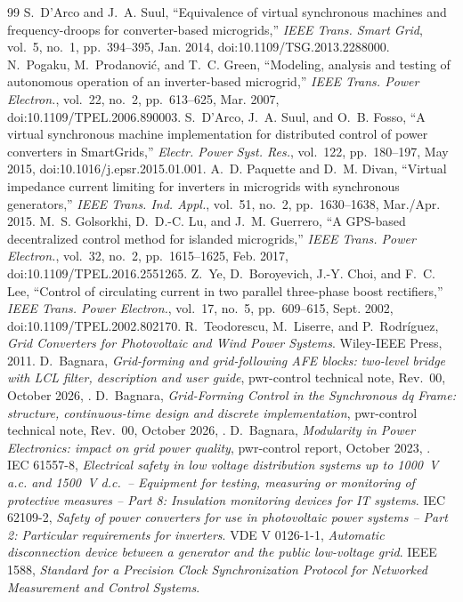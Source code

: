 \documentclass[11pt,a4paper]{scrartcl}
\begin{document}
\begin{onehalfspace}
\begin{thebibliography}{99}
	 S.~D'Arco and J.~A. Suul, ``Equivalence of virtual synchronous machines and frequency-droops for converter-based microgrids,'' \emph{IEEE Trans. Smart Grid}, vol.~5, no.~1, pp.~394--395, Jan. 2014, doi:10.1109/TSG.2013.2288000.
	 N.~Pogaku, M.~Prodanovi\'c, and T.~C. Green, ``Modeling, analysis and testing of autonomous operation of an inverter-based microgrid,'' \emph{IEEE Trans. Power Electron.}, vol.~22, no.~2, pp.~613--625, Mar. 2007, doi:10.1109/TPEL.2006.890003.
	 S.~D'Arco, J.~A. Suul, and O.~B. Fosso, ``A virtual synchronous machine implementation for distributed control of power converters in SmartGrids,'' \emph{Electr. Power Syst. Res.}, vol.~122, pp.~180--197, May 2015, doi:10.1016/j.epsr.2015.01.001.
	 A.~D. Paquette and D.~M. Divan, ``Virtual impedance current limiting for inverters in microgrids with synchronous generators,'' \emph{IEEE Trans. Ind. Appl.}, vol.~51, no.~2, pp.~1630--1638, Mar./Apr. 2015.
	 M.~S. Golsorkhi, D.~D.-C. Lu, and J.~M. Guerrero, ``A GPS-based decentralized control method for islanded microgrids,'' \emph{IEEE Trans. Power Electron.}, vol.~32, no.~2, pp.~1615--1625, Feb. 2017, doi:10.1109/TPEL.2016.2551265.
	 Z.~Ye, D.~Boroyevich, J.-Y. Choi, and F.~C. Lee, ``Control of circulating current in two parallel three-phase boost rectifiers,'' \emph{IEEE Trans. Power Electron.}, vol.~17, no.~5, pp.~609--615, Sept. 2002, doi:10.1109/TPEL.2002.802170.
	 R.~Teodorescu, M.~Liserre, and P.~Rodr\'iguez, \emph{Grid Converters for Photovoltaic and Wind Power Systems}. Wiley-IEEE Press, 2011.
	 D.~Bagnara, \emph{Grid-forming and grid-following AFE blocks: two-level bridge with LCL filter, description and user guide}, pwr-control technical note, Rev.~00, October 2026, .
	 D.~Bagnara, \emph{Grid-Forming Control in the Synchronous dq Frame: structure, continuous-time design and discrete implementation}, pwr-control technical note, Rev.~00, October 2026, .
	 D.~Bagnara, \emph{Modularity in Power Electronics: impact on grid power quality}, pwr-control report, October 2023, .
	 IEC 61557-8, \emph{Electrical safety in low voltage distribution systems up to 1000~V a.c. and 1500~V d.c.\ -- Equipment for testing, measuring or monitoring of protective measures -- Part 8: Insulation monitoring devices for IT systems}.
	 IEC 62109-2, \emph{Safety of power converters for use in photovoltaic power systems -- Part 2: Particular requirements for inverters}.
	 VDE V 0126-1-1, \emph{Automatic disconnection device between a generator and the public low-voltage grid}.
	 IEEE 1588, \emph{Standard for a Precision Clock Synchronization Protocol for Networked Measurement and Control Systems}.
\end{thebibliography}

\end{onehalfspace}
\end{document}
